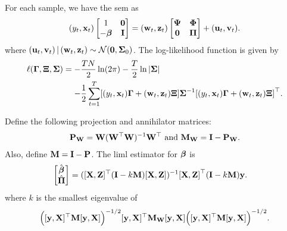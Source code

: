 \documentclass[a4paper]{article}
\begin{document}
\begin{example}
	For each sample, we have the \gls*{sem} as
	\begin{align}
		(y_t,\xx_t)
		\begin{bmatrix}
			1 & \zero \\
			-\bbeta & \II
		\end{bmatrix}
		=
		(\ww_t,\zz_t)
		\begin{bmatrix}
			\PSI & \PHI \\
			\zero & \PI
		\end{bmatrix}
		+
		(\uu_t,\vv_t).
	\end{align}
	where $(\uu_t,\vv_t)\given(\ww_t,\zz_t)\sim\mathcal{N}(\zero,\SIGMA_0)$.
	The log-likelihood function is given by
	\begin{align}\label{eq:log-likleihood-function}
		\begin{aligned}
			\ell(\GAMMA,\XI,\SIGMA)
			&=
			-\frac{TN}{2}\ln(2\pi)
			-\frac{T}2\ln|\SIGMA| \\
			&\mathrel{\phantom{=}}
			- \frac1{2} \sum_{t=1}^{T} [(y_t,\xx_t)\GAMMA + (\ww_t,\zz_t)\XI] \SIGMA\inv{[(y_t,\xx_t)\GAMMA + (\ww_t,\zz_t)\XI]}\T.
		\end{aligned}
	\end{align}
\end{example}

\begin{definition}\label{dfn:liml}
	Define the following projection and annihilator matrices:
	\begin{align*}
		\PP_\WW = \WW(\WW\T\WW)\inv\WW\T \text{ and } \MM_\WW = \II - \PP_\WW.
	\end{align*}
	Also, define $\MM=\II-\PP$.
	The \gls*{liml} estimator for $\bbeta$ is
	\begin{align}\label{eq:liml-estimator}
		\begin{bmatrix}
			\hat\bbeta \\ \hat\PI
		\end{bmatrix}
		&=
		(
		[\XX,\ZZ]\T
		(\II - k\MM)
		[\XX,\ZZ]
		)\inv
		{[\XX,\ZZ]}\T
		(\II - k\MM)
		\yy.
	\end{align}
	where $k$ is the smallest eigenvalue of
	\begin{align*}
		\Bigl([\yy,\XX]\T\MM[\yy,\XX]\Bigr)\inv[1/2]
		[\yy,\XX]\T\MM_\WW[\yy,\XX]
		\Bigl([\yy,\XX]\T\MM[\yy,\XX]\Bigr)\inv[1/2].
	\end{align*}
\end{definition}
\end{document}
